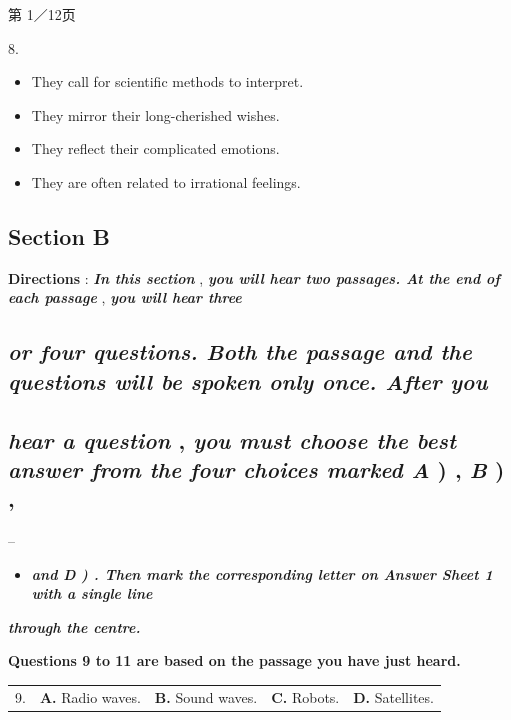 \documentclass[UTF8,11pt]{ctexart}
\begin{document}
第 1／12页


8.


\begin{itemize}[leftmargin=2em,itemsep=.2em,topsep=.4em]\item[A.] They call for scientific methods to interpret.
\item[B.] They mirror their long-cherished wishes.
\item[C.] They reflect their complicated emotions.
\item[D.] They are often related to irrational feelings.
\end{itemize}

\subsection*{\textbf{Section B}}


\textbf{Directions }: \textbf{\textit{In this section }}, \textbf{\textit{you will hear two passages. At the end of each passage }}, \textbf{\textit{you will hear three}}


\subsection*{\textbf{\textit{or four questions. Both the passage and the questions will be spoken only once. After you}}}


\subsection*{\textbf{\textit{hear a question }}, \textbf{\textit{you must choose the best answer from the four choices marked A }}) , \textbf{\textit{B }}) ,}


--


\begin{itemize}[leftmargin=2em,itemsep=.2em,topsep=.4em]\item[C.] \textbf{\textit{and D ) . Then mark the corresponding letter on Answer Sheet 1 with a single line}}
\end{itemize}

\textbf{\textit{through the centre.}}


\textbf{Questions 9 to 11 are based on the passage you have just heard.}


\noindent\begin{tabularx}{\linewidth}{@{}lXXXX@{}}9. & \textbf{A.} Radio waves. & \textbf{B.} Sound waves. & \textbf{C.} Robots. & \textbf{D.} Satellites.\\\end{tabularx}\par
\end{document}
